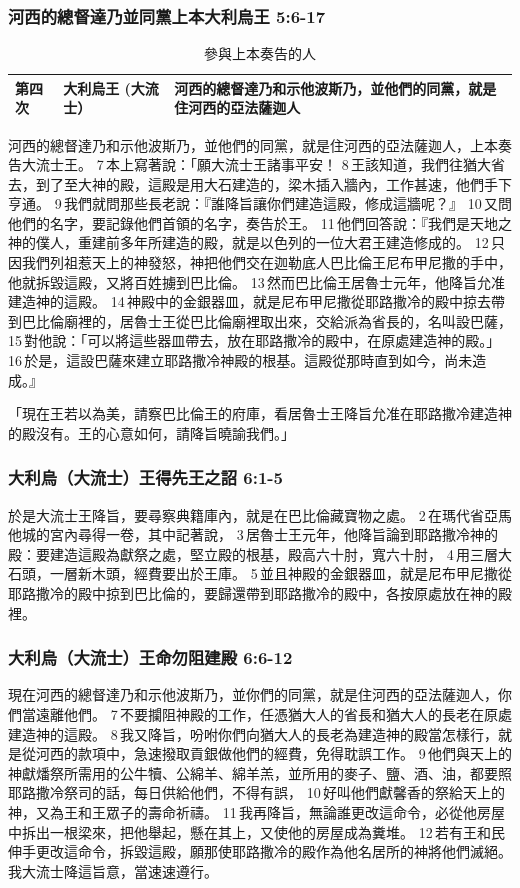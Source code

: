 \subsubsection{河西的總督達乃並同黨上本大利烏王 5:6-17}
\begin{table}[!hbp]
\centering 
\begin{tabular}{|p{1.5cm}|p{3cm}|p{8cm}|}
\hline
\hline
第四次 & 大利烏王 (大流士）&河西的總督達乃和示他波斯乃，並他們的同黨，就是住河西的亞法薩迦人  \\\hline
\end{tabular}
\caption{參與上本奏告的人}
\end{table}
河西的總督達乃和示他波斯乃，並他們的同黨，就是住河西的亞法薩迦人，上本奏告大流士王。 7 本上寫著說：「願大流士王諸事平安！ 8 王該知道，我們往猶大省去，到了至大神的殿，這殿是用大石建造的，梁木插入牆內，工作甚速，他們手下亨通。 9 我們就問那些長老說：『誰降旨讓你們建造這殿，修成這牆呢？』 10 又問他們的名字，要記錄他們首領的名字，奏告於王。 11 他們回答說：『我們是天地之神的僕人，重建前多年所建造的殿，就是以色列的一位大君王建造修成的。 12 只因我們列祖惹天上的神發怒，神把他們交在迦勒底人巴比倫王尼布甲尼撒的手中，他就拆毀這殿，又將百姓擄到巴比倫。 13 然而巴比倫王居魯士元年，他降旨允准建造神的這殿。 14 神殿中的金銀器皿，就是尼布甲尼撒從耶路撒冷的殿中掠去帶到巴比倫廟裡的，居魯士王從巴比倫廟裡取出來，交給派為省長的，名叫設巴薩， 15 對他說：「可以將這些器皿帶去，放在耶路撒冷的殿中，在原處建造神的殿。」 16 於是，這設巴薩來建立耶路撒冷神殿的根基。這殿從那時直到如今，尚未造成。』

「現在王若以為美，請察巴比倫王的府庫，看居魯士王降旨允准在耶路撒冷建造神的殿沒有。王的心意如何，請降旨曉諭我們。」


\subsubsection{大利烏（大流士）王得先王之詔 6:1-5}
於是大流士王降旨，要尋察典籍庫內，就是在巴比倫藏寶物之處。 2 在瑪代省亞馬他城的宮內尋得一卷，其中記著說， 3 居魯士王元年，他降旨論到耶路撒冷神的殿：要建造這殿為獻祭之處，堅立殿的根基，殿高六十肘，寬六十肘， 4 用三層大石頭，一層新木頭，經費要出於王庫。 5 並且神殿的金銀器皿，就是尼布甲尼撒從耶路撒冷的殿中掠到巴比倫的，要歸還帶到耶路撒冷的殿中，各按原處放在神的殿裡。

\subsubsection{大利烏（大流士）王命勿阻建殿 6:6-12}
現在河西的總督達乃和示他波斯乃，並你們的同黨，就是住河西的亞法薩迦人，你們當遠離他們。 7 不要攔阻神殿的工作，任憑猶大人的省長和猶大人的長老在原處建造神的這殿。 8 我又降旨，吩咐你們向猶大人的長老為建造神的殿當怎樣行，就是從河西的款項中，急速撥取貢銀做他們的經費，免得耽誤工作。 9 他們與天上的神獻燔祭所需用的公牛犢、公綿羊、綿羊羔，並所用的麥子、鹽、酒、油，都要照耶路撒冷祭司的話，每日供給他們，不得有誤， 10 好叫他們獻馨香的祭給天上的神，又為王和王眾子的壽命祈禱。 11 我再降旨，無論誰更改這命令，必從他房屋中拆出一根梁來，把他舉起，懸在其上，又使他的房屋成為糞堆。 12 若有王和民伸手更改這命令，拆毀這殿，願那使耶路撒冷的殿作為他名居所的神將他們滅絕。我大流士降這旨意，當速速遵行。

